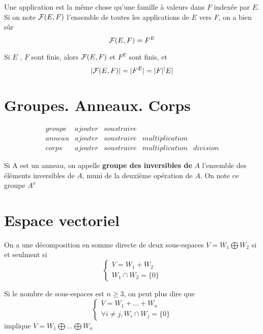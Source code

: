\documentclass{article}
\begin{document}
Une application est la m\^eme chose qu'une famille \`a valeurs dans $F$ index\'ee par $E$. Si on note ${\cal F}(E,F)$ l'ensemble de toutes les applications de $E$ vers $F$, on a bien s\^ur
$$
{\cal F}(E,F)=F^E
$$

Si $E$ , $F$ sont finis, alors ${\cal F}(E,F)$ et $F^E$ sont finis, et
$$
|{\cal F}(E,F)|=|F^E|=|F|^|E|
$$

\section{Groupes. Anneaux. Corps}
$$
\begin{array}{l|llll}
groupe & ajouter & soustraire &&\\
\hline
anneau & ajouter & soustraire & multiplication & \\
\hline
corps & ajouter & soustraire & multiplication & division
\end{array}
$$


Si A est un anneau, on appelle  {\bf groupe des inversibles de} $A$ l'ensemble des \'el\'ements inversibles de $A$, muni de la deuxi\`eme op\'eration de $A$. On note ce groupe $A^o$

\section{Espace vectoriel}
\begin{theorem}
  On a une d\'ecomposition en somme directe de deux sous-espaces $ V = W_1 \bigoplus W_2$  si et seulment si
  $$
    \begin{cases}
    V=W_1+W_2 \\
    W_1\cap W_2=\{0\}
    \end{cases}
  $$
\end{theorem}
\begin{attention}
  Si le nombre de sous-espaces est $n\geqslant 3$, on peut plus dire que
  $$
    \begin{cases}
    V=W_1+\dots+W_n \\
    \forall i \neq j,W_i\cap W_j=\{0\}
    \end{cases}
  $$
  implique $ V = W_1 \bigoplus \dots \bigoplus W_n$
\end{attention}
\end{document}
